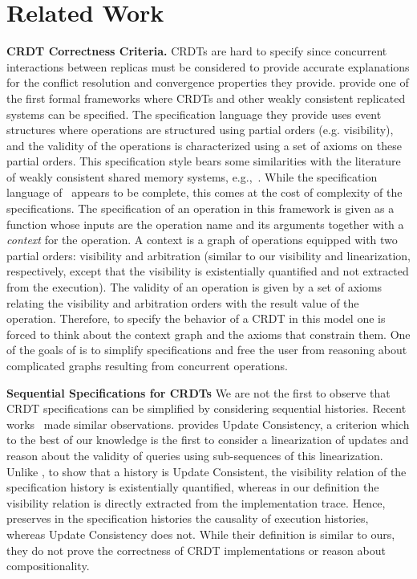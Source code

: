 \section{Related Work}
\label{sec:rel-work}

\noindent
{\bf CRDT Correctness Criteria.}
CRDTs are hard to specify since concurrent interactions between
replicas must be considered to provide accurate explanations for the
conflict resolution and convergence properties they provide.
%
\citet{BurckhardtGYZ14, Burckhardt14} provide one of the first formal
frameworks where CRDTs and other weakly consistent replicated systems
can be specified.
%
The specification language they provide uses event structures where
operations are structured using partial orders (e.g. visibility), and
the validity of the operations is characterized using a set of
axioms on these partial orders.
%
This specification style bears some similarities with the literature
of weakly consistent shared memory systems, e.g.,~\cite{AlglaveMT14}.
%
While the specification language
of~\cite{BurckhardtGYZ14,Burckhardt14} appears to be complete, this
comes at the cost of complexity of the specifications.
%
The specification of an operation in this framework is given as a
function whose inputs are the operation name and its arguments
together with a \emph{context} for the operation.
%
A context is a graph of operations equipped with two partial orders:
visibility and arbitration (similar to our visibility and linearization, respectively,
except that the visibility is existentially quantified and not extracted from the execution).
%
%
The validity of an operation is given by a set of axioms relating the
visibility and arbitration orders with the result value of the
operation.
%
Therefore, to specify the behavior of a CRDT in this model one is
forced to think about the context graph and the axioms that constrain
them.
%
One of the goals of \CRDTLinshort{} is to simplify specifications and
free the user from reasoning about complicated graphs resulting from
concurrent operations.

\smallskip
\noindent
{\bf Sequential Specifications for CRDTs}
We are not the first to observe that CRDT specifications can be
simplified by considering sequential histories.
%
Recent works~\cite{PerrinMJ14, JagadeesanR18} made similar
observations.
%
\citet{PerrinMJ14} provides Update Consistency, a criterion which to
the best of our knowledge is the first to consider a linearization of
updates and reason about the validity of queries using sub-sequences
of this linearization.
%
Unlike \CRDTLinshort{}, to show that a history is Update Consistent,
the visibility relation of the specification history is existentially
quantified, whereas in our definition the visibility relation is
directly extracted from the implementation trace.
%
Hence, \CRDTLinshort{} preserves in the specification histories the
causality of execution histories, whereas Update Consistency does not.
%
While their definition is similar to ours, they do not prove the
correctness of CRDT implementations or reason about compositionality.

